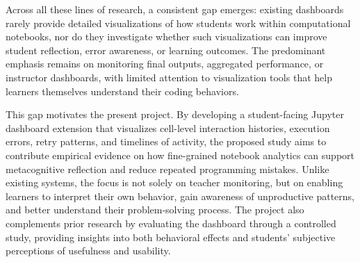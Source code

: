 Across all these lines of research, a consistent gap emerges: existing dashboards rarely provide detailed visualizations of how students work within computational notebooks, nor do they investigate whether such visualizations can improve student reflection, error awareness, or learning outcomes. The predominant emphasis remains on monitoring final outputs, aggregated performance, or instructor dashboards, with limited attention to visualization tools that help learners themselves understand their coding behaviors.

This gap motivates the present project. By developing a student-facing Jupyter dashboard extension that visualizes cell-level interaction histories, execution errors, retry patterns, and timelines of activity, the proposed study aims to contribute empirical evidence on how fine-grained notebook analytics can support metacognitive reflection and reduce repeated programming mistakes. Unlike existing systems, the focus is not solely on teacher monitoring, but on enabling learners to interpret their own behavior, gain awareness of unproductive patterns, and better understand their problem-solving process. The project also complements prior research by evaluating the dashboard through a controlled study, providing insights into both behavioral effects and students' subjective perceptions of usefulness and usability.